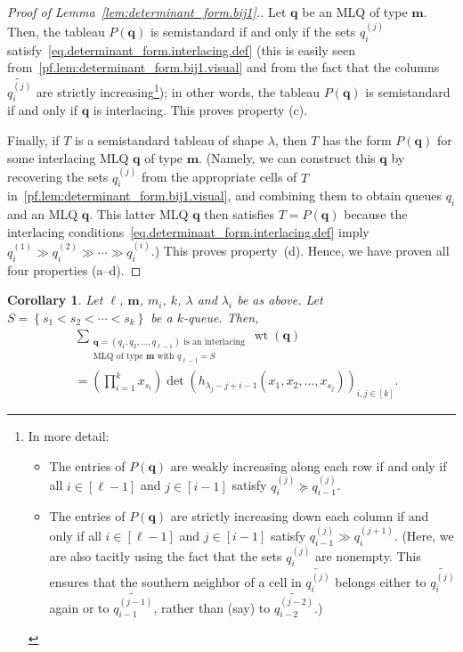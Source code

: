 \documentclass[reqno]{amsart}
\newcommand{\0}{\phantom{c}}
\DeclareMathOperator{\wt}{wt} %
\newcommand{\mm}{\mathbf{m}}
\newcommand{\qq}{\mathbf{q}}
\let\sumnonlimits\sum
\let\prodnonlimits\prod
\renewcommand{\sum}{\sumnonlimits\limits}
\renewcommand{\prod}{\prodnonlimits\limits}
\newcommand{\set}[1]{\left\{ #1 \right\}}
\newcommand{\tup}[1]{\left( #1 \right)}
\newcommand{\ive}[1]{\left[ #1 \right]}
\theoremstyle{plain}
\newtheorem{cor}[thm]{Corollary}
\theoremstyle{definition}
\numberwithin{equation}{section}
\begin{document}
\begin{proof}[Proof of Lemma~\ref{lem:determinant_form.bij1}.]
Let $\qq$ be an MLQ of type $\mm$.
Then, the tableau $P(\qq)$ is semistandard if and only if the sets $q_i^{(j)}$ satisfy~\eqref{eq.determinant_form.interlacing.def} (this is easily seen from~\eqref{pf.lem:determinant_form.bij1.visual} and from the fact that the columns $\widetilde{q_i^{(j)}}$ are strictly increasing\footnote{In more detail:
\begin{itemize}
\item The entries of $P(\qq)$ are weakly increasing along each row
if and only if all $i \in \ive{\ell-1}$ and $j \in \ive{i-1}$ satisfy
$q_i^{\left(j\right)} \succeq q_{i-1}^{\left(j\right)}$.
\item The entries of $P(\qq)$ are strictly increasing down each
column if and only if all $i \in \ive{\ell-1}$ and $j \in \ive{i-1}$ satisfy
$q_{i-1}^{\left(j\right)} \gg q_i^{\left(j+1\right)}$.
(Here, we are also tacitly using the fact that the sets
$q_i^{\left(  j\right)  }$ are nonempty. This ensures that the southern
neighbor of a cell in $\widetilde{q_i^{\left(  j\right)  }}$ belongs either
to $\widetilde{q_i^{\left(  j\right)  }}$ again or to
$\widetilde{q_{i-1}^{\left(  j-1\right)  }}$, rather than (say) to
$\widetilde{q_{i-2}^{\left(  j-2\right)  }}$.)
\end{itemize}
});
in other words, the tableau $P(\qq)$ is semistandard if and only if $\qq$ is interlacing.
This proves property (c).

Finally, if $T$ is a semistandard tableau of shape $\lambda$, then $T$ has the form $P(\qq)$ for some interlacing MLQ $\qq$ of type $\mm$.
(Namely, we can construct this $\qq$ by recovering the sets $q_i^{(j)}$ from the appropriate cells of $T$ in~\eqref{pf.lem:determinant_form.bij1.visual}, and combining them to obtain queues $q_i$ and an MLQ $\qq$.
This latter MLQ $\qq$ then satisfies $T = P(\qq)$ because the interlacing conditions~\eqref{eq.determinant_form.interlacing.def} imply $q_i^{(1)} \gg q_i^{(2)} \gg \cdots \gg q_i^{(i)}$.)
This proves property~(d).
Hence, we have proven all four properties (a--d).
\end{proof}

\begin{cor}
\label{cor:determinant_form.bij1c}
Let $\ell$, $\mm$, $m_i$, $k$, $\lambda$ and $\lambda_i$ be as above.
Let $S = \set{s_1 < s_2 < \cdots < s_k}$ be a $k$-queue.
Then,
\begin{align*}
&  \sum_{\substack{\qq=\tup{q_1,q_2,\ldots,q_{\ell-1}} \text{ is an interlacing}\\\text{MLQ of type $\mm$ with } q_{\ell-1}=S}} \wt(\qq) \\
&  = \left(  \prod_{i=1}^{k}x_{s_i}\right)
    \det\left(h_{\lambda_j-j+i-1}(x_1, x_2, \dotsc, x_{s_j}) \right)_{i, j \in \ive{k}} .
\end{align*}
\end{cor}
\end{document}
